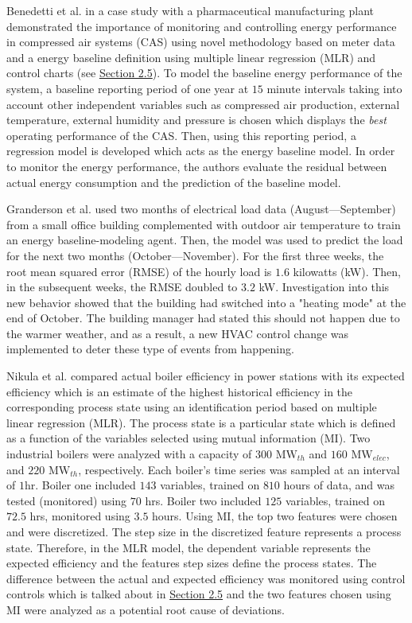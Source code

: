 Benedetti et al. \cite{cas} in a case study with a pharmaceutical manufacturing plant demonstrated the importance of monitoring and controlling energy performance in compressed air systems (CAS) using novel methodology based on meter data and a energy baseline definition using multiple linear regression (MLR) and control charts (see \hyperlink{subsection.2.5}{Section 2.5}). To model the baseline energy performance of the system, a baseline reporting period of one year at $15$ minute intervals taking into account other independent variables such as compressed air production, external temperature, external humidity and pressure is chosen which displays the \textit{best} operating performance of the CAS. Then, using this reporting period, a regression model is developed which acts as the energy baseline model. In order to monitor the energy performance, the authors evaluate the residual between actual energy consumption and the prediction of the baseline model. 

Granderson et al. \cite{lawrence-lab} used two months of electrical load data (August—September) from a small office building complemented with outdoor air temperature to train an energy baseline-modeling agent. Then, the model was used to predict the load for the next two months (October—November). For the first three weeks, the root mean squared error (RMSE) of the hourly load is $1.6$ kilowatts (kW). Then, in the subsequent weeks, the RMSE doubled to $3.2$ kW. Investigation into this new behavior showed that the building had switched into a "heating mode" at the end of October. The building manager had stated this should not happen due to the warmer weather, and as a result, a new HVAC control change was implemented to deter these type of events from happening. 

Nikula et al.\cite{boiler} compared actual boiler efficiency in power stations with its expected efficiency which is an estimate of the highest historical efficiency in the corresponding process state using an identification period based on multiple linear regression (MLR). The process state is a particular state which is defined as a function of the variables selected using mutual information (MI). Two industrial boilers were analyzed with a capacity of $300$ $\text{MW}_{th}$ and $160$ $\text{MW}_{elec}$, and $220$ $\text{MW}_{th}$, respectively. Each boiler's time series was sampled at an interval of $1$hr. Boiler one included $143$ variables, trained on $810$ hours of data, and was tested (monitored) using $70$ hrs. Boiler two included $125$ variables, trained on $72.5$ hrs, monitored using $3.5$ hours. Using MI, the top two features were chosen and were discretized. The step size in the discretized feature represents a process state. Therefore, in the MLR model, the dependent variable represents the expected efficiency and the features step sizes define the process states. The difference between the actual and expected efficiency was monitored using control controls which is talked about in \hyperlink{subsection.2.5}{Section 2.5} and the two features chosen using MI were analyzed as a potential root cause of deviations.

